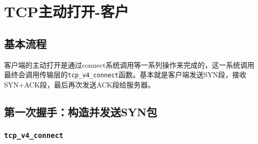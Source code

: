 \section{TCP主动打开-客户}
\label{sec:tcp_connect_client}

	\subsection{基本流程}
	\label{subsec:tcp_connect_flow}
		客户端的主动打开是通过connect系统调用等一系列操作来完成的，这一系统调用最终会调用传输层的\texttt{tcp_v4_connect}函数。基本就是客户端发送SYN段，接收SYN+ACK段，最后再次发送ACK段给服务器。

	\subsection{第一次握手：构造并发送SYN包}
	\label{subsec:tcp_connect_syn}

		\subsubsection{\texttt{tcp_v4_connect}}
		\label{subsubsec:tcp_v4_connect}

